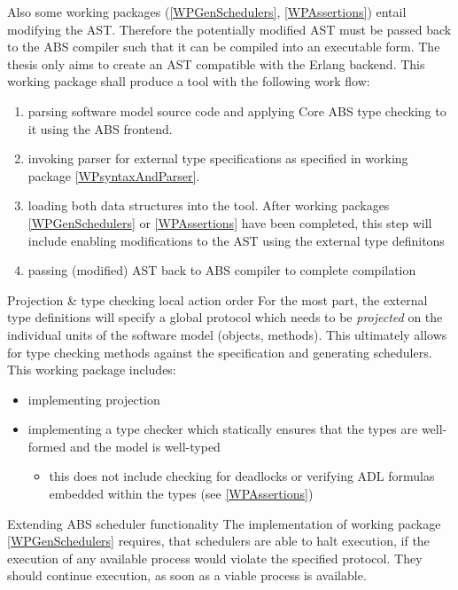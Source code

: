 \documentclass[paper=a4,nochapname,accentcolor=tud9c]{tudexercise}
\makeatletter
\def\namedlabel#1#2{\begingroup
    #1%
    \def\@currentlabel{\thedescriptcount}%
    \phantomsection\label{#2}\endgroup
}
\newcounter{descriptcount}
\renewcommand*\thedescriptcount{[\Alph{descriptcount}]}}
\renewcommand*\thedescriptcount{\roman{descriptcount}}}
\makeatother
\begin{document}
\begin{enumdescript}
    Also some working packages (\ref{WPGenSchedulers}, \ref{WPAssertions}) entail modifying the AST.
    Therefore the potentially modified AST must be passed back to the ABS
    compiler such that it can be compiled into an executable
    form. The thesis only aims to create an AST compatible with the Erlang backend.
    This working package shall produce a tool with the following work flow:
    \begin{enumerate}[label=\arabic*)]
      \item parsing software model source code and applying Core ABS type
        checking to it using the ABS frontend.
      \item invoking parser for external type specifications as specified in working
        package \ref{WPsyntaxAndParser}.
      \item loading both data structures into the tool. After working packages
        \ref{WPGenSchedulers} or \ref{WPAssertions} have been completed, this step will include enabling modifications to the AST using the external type definitons
      \item passing (modified) AST back to ABS compiler to complete compilation
    \end{enumerate}
  \item[\namedlabel{Projection \& type checking local action order}{WPProjectionAndTC}]%
    For the most part, the external type definitions will specify a global
    protocol which needs to be \emph{projected} on the individual units of the
    software model (objects, methods).
    This ultimately allows for type checking methods against the specification
    and generating schedulers.
    This working package includes:
    \begin{itemize}
      \item implementing projection
      \item implementing a type checker which statically ensures that the
        types are well-formed and the model is well-typed \cite{kamburjan2018stateful}
        \begin{itemize}
          \item this does not include checking for deadlocks or verifying ADL
            formulas embedded within the types (see \ref{WPAssertions})
        \end{itemize}
    \end{itemize}
  \item[\namedlabel{Extending ABS scheduler functionality}{WPExtendScheduler}]%
    The implementation of working package \ref{WPGenSchedulers} requires, that schedulers are able to
    halt execution, if the execution of any available process would violate the
    specified protocol. They should continue execution, as soon as a viable
    process is available.


\end{enumdescript}
\end{document}
